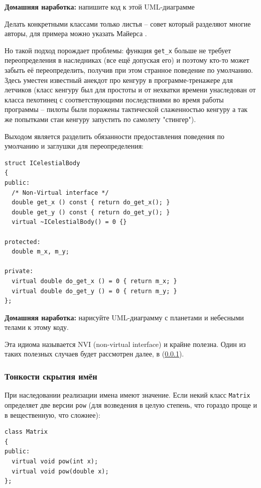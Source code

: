 \documentclass[a4paper,12pt,oneside]{article}
\begin{document}
\textbf{Домашняя наработка:} напишите код к этой UML-диаграмме

Делать конкретными классами только листья -- совет который разделяют многие авторы, для примера можно указать Майерса \cite{effcpp3d}.

Но такой подход порождает проблемы: функция \lstinline!get_x! больше не требует переопределения в наследниках (все ещё допуская его) и поэтому кто-то может забыть её переопределить, получив при этом странное поведение по умолчанию. Здесь уместен известный анекдот про кенгуру в программе-тренажере для летчиков (класс кенгуру был для простоты и от нехватки времени унаследован от класса пехотинец с соответствующими последствиями во время работы программы -- пилоты были поражены тактической слаженностью кенгуру а так же попытками стаи кенгуру запустить по самолету "стингер").

Выходом является разделить обязанности предоставления поведения по умолчанию и заглушки для переопределения:

\begin{lstlisting}
struct ICelestialBody
{
public:
  /* Non-Virtual interface */
  double get_x () const { return do_get_x(); }
  double get_y () const { return do_get_y(); }
  virtual ~ICelestialBody() = 0 {}

protected:
  double m_x, m_y;

private:
  virtual double do_get_x () = 0 { return m_x; }
  virtual double do_get_y () = 0 { return m_y; }
};
\end{lstlisting}

\textbf{Домашняя наработка:} нарисуйте UML-диаграмму с планетами и небесными телами к этому коду.

Эта идиома называется NVI (non-virtual interface) и крайне полезна. Один из таких полезных случаев будет рассмотрен далее, в (\ref{NameHiding}).

\subsubsection{Тонкости скрытия имён}\label{NameHiding}

При наследовании реализации имена имеют значение. Если некий класс \lstinline!Matrix! определяет две версии \lstinline!pow! (для возведения в целую степень, что гораздо проще и в вещественную, что сложнее):

\begin{lstlisting}
class Matrix
{
public:
  virtual void pow(int x);
  virtual void pow(double x);
};
\end{lstlisting}
\end{document}

